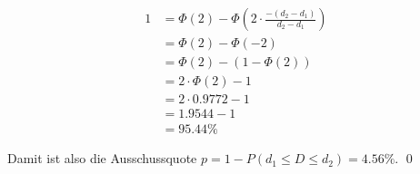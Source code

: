 \documentclass{abgabe}
\begin{document}
\begin{questions}
\begin{parts}
\begin{solution}
\begin{alignat*}{1}
                                       & = \Phi \left( 2 \right) - \Phi \left( 2 \cdot \frac{-(d_2 - d_1)}{d_2 - d_1} \right)                                                                    \\
                                       & = \Phi \left( 2 \right) - \Phi \left( -2 \right)                                                                                                        \\
                                       & = \Phi \left( 2 \right) - (1 - \Phi \left( 2 \right))                                                                                                   \\
                                       & = 2 \cdot \Phi \left( 2 \right) - 1                                                                                                                     \\
                                       & = 2 \cdot 0.9772  - 1                                                                                                                                   \\
                                       & = 1.9544  - 1                                                                                                                                           \\
                                       & = 95.44\%                                                                                                                            
            \end{alignat*}
            
            Damit ist also die Ausschussquote $p = 1 - P(d_1 \leq D \leq d_2) = 4.56\%$.
            \qed
        \end{solution}
        
        \newpage

\end{parts}
\end{questions}
\end{document}
